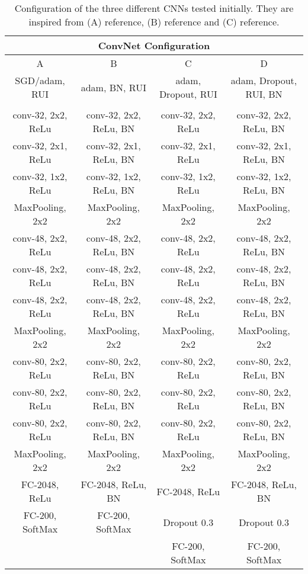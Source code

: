 \medskip
\begin{table}[htbp]
\begin{center}
\begin{tabular}{|c|c|c|c|}

  \hline
  \multicolumn{4}{|c|}{ConvNet Configuration} \\
  \hline

  A & B & C & D
  \\\hline

  SGD/adam, RUI & adam, BN, RUI &  adam, Dropout, RUI & adam, Dropout, RUI, BN
  \\\hhline{|=|=|=|=|}

  \multicolumn{4}{|c|}{input ($64\times64\;RGB\;image$)}
  \\\hline

  conv-32, 2x2, ReLu & conv-32, 2x2, ReLu, BN & conv-32, 2x2, ReLu & conv-32, 2x2, ReLu, BN \\
  conv-32, 2x1, ReLu & conv-32, 2x1, ReLu, BN & conv-32, 2x1, ReLu & conv-32, 2x1, ReLu, BN \\
  conv-32, 1x2, ReLu & conv-32, 1x2, ReLu, BN & conv-32, 1x2, ReLu & conv-32, 1x2, ReLu, BN \\
  \hline
  MaxPooling, 2x2    & MaxPooling, 2x2    & MaxPooling, 2x2    & MaxPooling, 2x2 \\
  \hline
  conv-48, 2x2, ReLu & conv-48, 2x2, ReLu, BN & conv-48, 2x2, ReLu & conv-48, 2x2, ReLu, BN \\
  conv-48, 2x2, ReLu & conv-48, 2x2, ReLu, BN & conv-48, 2x2, ReLu & conv-48, 2x2, ReLu, BN \\
  conv-48, 2x2, ReLu & conv-48, 2x2, ReLu, BN & conv-48, 2x2, ReLu & conv-48, 2x2, ReLu, BN \\
  \hline
  MaxPooling, 2x2    & MaxPooling, 2x2    & MaxPooling, 2x2    & MaxPooling, 2x2 \\
  \hline
  conv-80, 2x2, ReLu & conv-80, 2x2, ReLu, BN & conv-80, 2x2, ReLu & conv-80, 2x2, ReLu, BN \\
  conv-80, 2x2, ReLu & conv-80, 2x2, ReLu, BN & conv-80, 2x2, ReLu & conv-80, 2x2, ReLu, BN \\
  conv-80, 2x2, ReLu & conv-80, 2x2, ReLu, BN & conv-80, 2x2, ReLu & conv-80, 2x2, ReLu, BN \\
  \hline
  MaxPooling, 2x2    & MaxPooling, 2x2        & MaxPooling, 2x2    & MaxPooling, 2x2 \\
  \hline
  FC-2048, ReLu      & FC-2048, ReLu, BN      & FC-2048, ReLu      & FC-2048, ReLu, BN
  \\\hline
  FC-200, SoftMax    & FC-200, SoftMax        & Dropout 0.3        & Dropout 0.3   \\
  \hline
                    &                         & FC-200, SoftMax    & FC-200, SoftMax \\
  \hline
  \end{tabular}
\caption[]
{\small
  Configuration of the three different CNNs tested initially. They are inspired from (A) reference, (B) reference and (C) reference.
}
\label{table:3_configurations}
\end{center}
\end{table}
